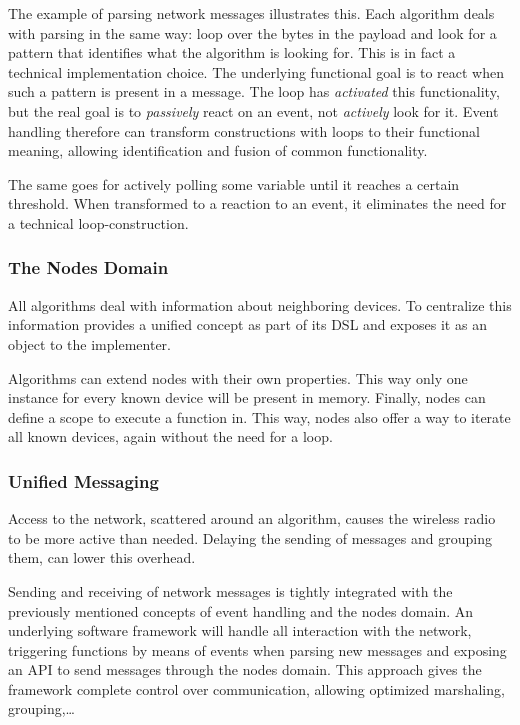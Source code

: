 \documentclass[conference]{IEEEtran}
\begin{document}
The example of parsing network messages illustrates this. Each algorithm deals
with parsing in the same way: loop over the bytes in the payload and look for a
pattern that identifies what the algorithm is looking for. This is in fact a
technical implementation choice. The underlying functional goal is to react
when such a pattern is present in a message. The loop has \emph{activated} this
functionality, but the real goal is to \emph{passively} react on an event, not
\emph{actively} look for it. Event handling therefore can transform
constructions with loops to their functional meaning, allowing identification
and fusion of common functionality.

The same goes for actively polling some variable until it reaches a certain
threshold. When transformed to a reaction to an event, it eliminates the need
for a technical loop-construction.

\subsubsection{The Nodes Domain}

All algorithms deal with information about neighboring devices. To centralize
this information \NAME provides a unified  concept as part of its
DSL and exposes it as an object to the implementer.

Algorithms can extend nodes with their own properties. This way only one
instance for every known device will be present in memory. Finally, nodes can
define a scope to execute a function in. This way, nodes also offer a way to
iterate all known devices, again without the need for a loop.

\subsubsection{Unified Messaging}
\label{dsl-unified-msg}

Access to the network, scattered around an algorithm, causes the wireless radio
to be more active than needed. Delaying the sending of messages and grouping
them, can lower this overhead.

Sending and receiving of network messages is tightly integrated with the
previously mentioned concepts of event handling and the nodes domain. An
underlying software framework will handle all interaction with the network,
triggering functions by means of events when parsing new messages and exposing
an API to send messages through the nodes domain. This approach gives the
framework complete control over communication, allowing optimized marshaling,
grouping,\dots
\end{document}
